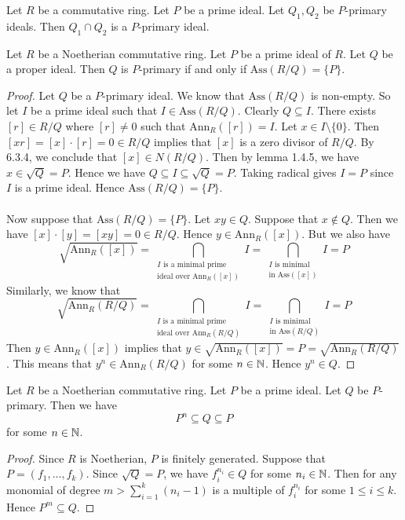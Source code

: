 \documentclass[a4paper]{article}
\begin{document}
\begin{lmm}{}{} Let $R$ be a commutative ring. Let $P$ be a prime ideal. Let $Q_1,Q_2$ be $P$-primary ideals. Then $Q_1\cap Q_2$ is a $P$-primary ideal. 
\end{lmm}

\begin{prp}{}{} Let $R$ be a Noetherian commutative ring. Let $P$ be a prime ideal of $R$. Let $Q$ be a proper ideal. Then $Q$ is $P$-primary if and only if $\text{Ass}(R/Q)=\{P\}$. 
\begin{proof}
Let $Q$ be a $P$-primary ideal. We know that $\text{Ass}(R/Q)$ is non-empty. So let $I$ be a prime ideal such that $I\in\text{Ass}(R/Q)$. Clearly $Q\subseteq I$. There exists $[r]\in R/Q$ where $[r]\neq 0$ such that $\text{Ann}_R([r])=I$. Let $x\in I\setminus\{0\}$. Then $[xr]=[x]\cdot[r]=0\in R/Q$ implies that $[x]$ is a zero divisor of $R/Q$. By 6.3.4, we conclude that $[x]\in N(R/Q)$. Then by lemma 1.4.5, we have $x\in\sqrt{Q}=P$. Hence we have $Q\subseteq I\subseteq\sqrt{Q}=P$. Taking radical gives $I=P$ since $I$ is a prime ideal. Hence $\text{Ass}(R/Q)=\{P\}$. \\~\\

Now suppose that $\text{Ass}(R/Q)=\{P\}$. Let $xy\in Q$. Suppose that $x\notin Q$. Then we have $[x]\cdot[y]=[xy]=0\in R/Q$. Hence $y\in\text{Ann}_R([x])$. But we also have $$\sqrt{\text{Ann}_R([x])}=\bigcap_{\substack{I\text{ is a minimal prime}\\\text{ideal over Ann}_R([x])}}I=\bigcap_{\substack{I\text{ is minimal}\\\text{in Ass}([x])}}I=P$$ Similarly, we know that $$\sqrt{\text{Ann}_R(R/Q)}=\bigcap_{\substack{I\text{ is a minimal prime}\\\text{ideal over Ann}_R(R/Q)}}I=\bigcap_{\substack{I\text{ is minimal}\\\text{in Ass}(R/Q)}}I=P$$ Then $y\in\text{Ann}_R([x])$ implies that $y\in\sqrt{\text{Ann}_R([x])}=P=\sqrt{\text{Ann}_R(R/Q)}$. This means that $y^n\in\text{Ann}_R(R/Q)$ for some $n\in\mathbb{N}$. Hence $y^n\in Q$. 
\end{proof}
\end{prp}

\begin{lmm}{}{} Let $R$ be a Noetherian commutative ring. Let $P$ be a prime ideal. Let $Q$ be $P$-primary. Then we have $$P^n\subseteq Q\subseteq P$$ for some $n\in\mathbb{N}$. 
\begin{proof}
Since $R$ is Noetherian, $P$ is finitely generated. Suppose that $P=(f_1,\dots,f_k)$. Since $\sqrt{Q}=P$, we have $f_i^{n_i}\in Q$ for some $n_i\in\mathbb{N}$. Then for any monomial of degree $m>\sum_{i=1}^k(n_i-1)$ is a multiple of $f_i^{n_i}$ for some $1\leq i\leq k$. Hence $P^m\subseteq Q$. 
\end{proof}
\end{lmm}
\end{document}

